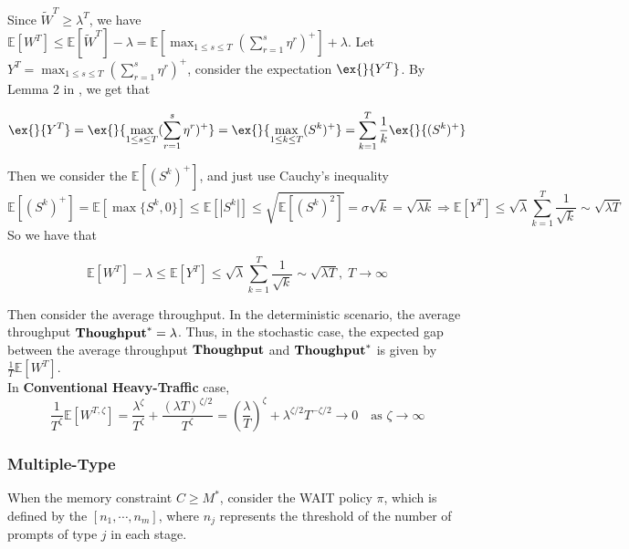 Since $\tilde{W}^T \geq \lambda^T$, we have $\mathbb{E}[W^T]\leq \mathbb{E}[\tilde{W}^T]-\lambda = \mathbb{E}[\max_{1\leq s\leq T}(\sum_{r=1}^{s}\eta^r)^+]+\lambda$. Let $Y^T = \max_{1\leq s\leq T}(\sum_{r=1}^{s}\eta^r)^+$, consider the expectation $\ex{}{Y^T}$.
By Lemma 2 in \cite{strait1974maximum}, we get that
\begin{lemma}\label{lem:Y_T}
    $$\ex{}{Y^T}=\ex{}{\max_{1\leq s\leq T}(\sum_{r=1}^s\eta^r)^+}=\ex{}{\max_{1\leq k\leq T}(S^k)^+}=\sum_{k=1}^T \frac{1}{k}\ex{}{(S^k)^+}$$
\end{lemma}
Then we consider the $\mathbb{E}[(S^k)^+]$, and just use Cauchy's inequality
$$\mathbb{E}[(S^k)^+] = \mathbb{E}[\max\{S^k, 0\}]
    \leq \mathbb{E}[|S^k|] \leq \sqrt{\mathbb{E}[(S^k)^2]}= \sigma\sqrt{k} = \sqrt{\lambda k}
    \Rightarrow \mathbb{E}[Y^T] \leq \sqrt{\lambda} \sum_{k=1}^T \frac{1}{\sqrt{k}} \sim \sqrt{\lambda T}
$$
So we have that 
\begin{lemma}\label{lemma::throughput gap}
    $$\mathbb{E}[W^T]-\lambda\leq \mathbb{E}[Y^T]\leq  \sqrt{\lambda} \sum_{k=1}^T \frac{1}{\sqrt{k}} \sim\sqrt{\lambda T},\; T\to \infty$$
\end{lemma}
Then consider the average throughput. In the deterministic scenario, the average throughput $\textbf{Thoughput}^* = \lambda$. Thus, in the stochastic case, the expected gap between the average throughput $\textbf{Thoughput}$ and $\textbf{Thoughput}^*$ is given by $\frac{1}{T}\mathbb{E}[W^T]$.\\
In \textbf{Conventional Heavy-Traffic} case, 
$$\frac{1}{T^{\zeta}}\mathbb{E}[W^{T,\zeta}]= \frac{\lambda^{\zeta}}{T^{\zeta}} + \frac{(\lambda T)^{\zeta/2}}{T^{\zeta}} = \left(\frac{\lambda}{T}\right)^{\!\zeta} + \lambda^{\zeta/2} T^{-\zeta/2} \to 0 \quad \text{as } \zeta \to \infty$$
\subsubsection{Multiple-Type}

When the memory constraint $C\geq M^*$, consider the WAIT policy $\pi$, which is defined by the $[n_1,\cdots,n_m]$, where $n_j$ represents the threshold of the number of prompts of type $j$ in each stage.

